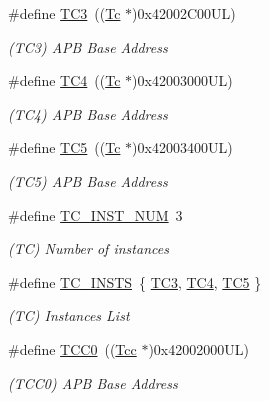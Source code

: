 \begin{DoxyCompactItemize}
\#define \mbox{\hyperlink{group___s_a_m_d21_e15_l__base_ga96dbeca00ecf683666f989fbc2425d89}{T\+C3}}~((\mbox{\hyperlink{union_tc}{Tc}}       $\ast$)0x42002\+C00\+U\+L)
\begin{DoxyCompactList}\small\item\em (T\+C3) A\+PB Base Address \end{DoxyCompactList}\item 
\#define \mbox{\hyperlink{group___s_a_m_d21_e15_l__base_ga877f51fe7311fbc9c49c966ba738be05}{T\+C4}}~((\mbox{\hyperlink{union_tc}{Tc}}       $\ast$)0x42003000\+U\+L)
\begin{DoxyCompactList}\small\item\em (T\+C4) A\+PB Base Address \end{DoxyCompactList}\item 
\#define \mbox{\hyperlink{group___s_a_m_d21_e15_l__base_ga410ec3addea710896df03e12e3fb75da}{T\+C5}}~((\mbox{\hyperlink{union_tc}{Tc}}       $\ast$)0x42003400\+U\+L)
\begin{DoxyCompactList}\small\item\em (T\+C5) A\+PB Base Address \end{DoxyCompactList}\item 
\#define \mbox{\hyperlink{group___s_a_m_d21_e15_l__base_ga7895260bd2341a4b228dd6402c507c75}{T\+C\+\_\+\+I\+N\+S\+T\+\_\+\+N\+UM}}~3
\begin{DoxyCompactList}\small\item\em (TC) Number of instances \end{DoxyCompactList}\item 
\#define \mbox{\hyperlink{group___s_a_m_d21_e15_l__base_ga7661dbfecc08b2fb20b38c91004456f3}{T\+C\+\_\+\+I\+N\+S\+TS}}~\{ \mbox{\hyperlink{group___s_a_m_d21_j18_a__base_ga96dbeca00ecf683666f989fbc2425d89}{T\+C3}}, \mbox{\hyperlink{group___s_a_m_d21_j18_a__base_ga877f51fe7311fbc9c49c966ba738be05}{T\+C4}}, \mbox{\hyperlink{group___s_a_m_d21_j18_a__base_ga410ec3addea710896df03e12e3fb75da}{T\+C5}} \}
\begin{DoxyCompactList}\small\item\em (TC) Instances List \end{DoxyCompactList}\item 
\#define \mbox{\hyperlink{group___s_a_m_d21_e15_l__base_ga99138b66570ac6a4b370ce5c3b52cd9f}{T\+C\+C0}}~((\mbox{\hyperlink{struct_tcc}{Tcc}}      $\ast$)0x42002000\+U\+L)
\begin{DoxyCompactList}\small\item\em (T\+C\+C0) A\+PB Base Address \end{DoxyCompactList}\item 

\end{DoxyCompactItemize}
